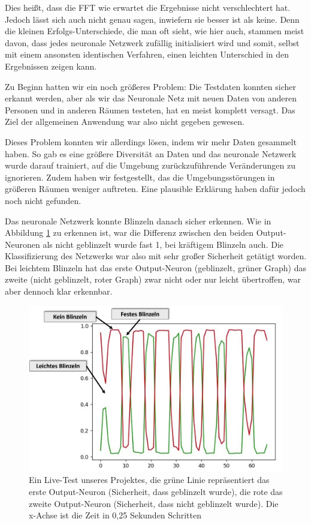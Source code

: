 \documentclass[10pt]{scrartcl}
\begin{document}
	Dies heißt, dass die FFT wie erwartet die Ergebnisse nicht verschlechtert hat. Jedoch lässt sich auch nicht genau sagen, inwiefern sie besser ist als keine. Denn die kleinen Erfolgs-Unterschiede, die man oft sieht, wie hier auch, stammen meist davon, dass jedes neuronale Netzwerk zufällig initialisiert wird und somit, selbst mit einem ansonsten identischen Verfahren, einen leichten Unterschied in den Ergebnissen zeigen kann.

	Zu Beginn hatten wir ein noch größeres Problem: Die Testdaten konnten sicher erkannt werden, aber als wir das Neuronale Netz mit neuen Daten von anderen Personen und in anderen Räumen testeten, hat en meist komplett versagt. Das Ziel der allgemeinen Anwendung war also nicht gegeben gewesen. 

	Dieses Problem konnten wir allerdings lösen, indem wir mehr Daten gesammelt haben. So gab es eine größere Diversität an Daten und das neuronale Netzwerk wurde darauf trainiert, auf die Umgebung zurückzuführende Veränderungen zu ignorieren. Zudem haben wir festgestellt, das die Umgebungsstörungen in größeren Räumen weniger auftreten. Eine plausible Erklärung haben dafür jedoch noch nicht gefunden.

	Das neuronale Netzwerk konnte Blinzeln danach sicher erkennen. Wie in Abbildung \ref{test-graph} zu erkennen ist, war die Differenz zwischen den beiden Output-Neuronen als nicht geblinzelt wurde fast 1, bei kräftigem Blinzeln auch. Die Klassifizierung des Netzwerks war also mit sehr großer Sicherheit getätigt worden. Bei leichtem Blinzeln hat das erste Output-Neuron (geblinzelt, grüner Graph) das zweite (nicht geblinzelt, roter Graph) zwar nicht oder nur leicht übertroffen, war aber dennoch klar erkennbar.

	\begin{figure}[h!]
		\includegraphics[width=\textwidth]{pictures/Test-Graph-annotated.png}
		\caption{Ein Live-Test unseres Projektes, die grüne Linie repräsentiert das erste Output-Neuron (Sicherheit, dass geblinzelt wurde), die rote das zweite Output-Neuron (Sicherheit, dass nicht geblinzelt wurde). Die x-Achse ist die Zeit in 0,25 Sekunden Schritten}
		\label{test-graph}
	\end{figure}
\end{document}
